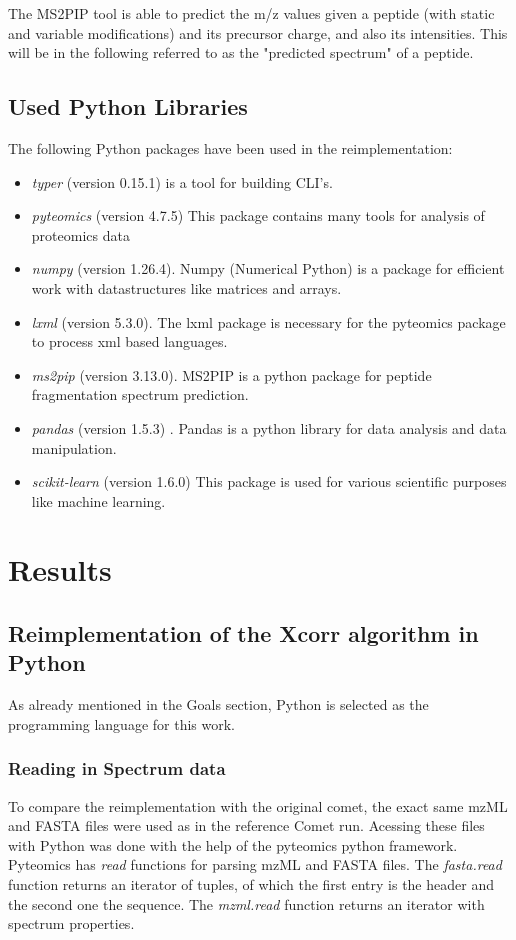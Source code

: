 \documentclass[11pt]{article}
\begin{document}
The MS2PIP tool is able to predict the m/z values given a peptide (with static and variable modifications) and its precursor charge, and also its intensities. This will be in the following referred to as the "predicted spectrum" of a peptide.

\subsection{Used Python Libraries}
The following Python packages have been used in the reimplementation:
\begin{itemize}
    \item \textit{typer} (version 0.15.1) is a tool for building CLI's.
    \item \textit{pyteomics} (version 4.7.5) This package contains many tools for analysis of proteomics data \cite{pyteomics, pyteomics-five-years}
    \item \textit{numpy} (version 1.26.4). Numpy (Numerical Python) is a package for efficient work with datastructures like matrices and arrays.
    \item \textit{lxml} (version 5.3.0). The lxml package is necessary for the pyteomics package to process xml based languages.
    \item \textit{ms2pip} (version 3.13.0). MS2PIP is a python package for peptide fragmentation spectrum prediction.
    \item \textit{pandas} (version 1.5.3) . Pandas is a python library for data analysis and data manipulation.
    \item \textit{scikit-learn} (version 1.6.0) This package is used for various scientific purposes like machine learning.
\end{itemize}

\newpage

\section{Results}

\subsection{Reimplementation of the Xcorr algorithm in Python}
As already mentioned in the Goals section, Python is selected as the programming language for this work.

\subsubsection{Reading in Spectrum data}
To compare the reimplementation with the original comet, the exact same mzML and FASTA files were used as in the reference Comet run. Acessing these files with Python was done with the help of the pyteomics python framework. Pyteomics has \textit{read} functions for parsing mzML and FASTA files. The \textit{fasta.read} function returns an iterator of tuples, of which the first entry is the header and the second one the sequence. The \textit{mzml.read} function returns an iterator with spectrum properties.
\end{document}

